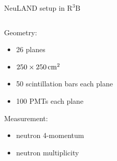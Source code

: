 \documentclass[compress, 13pt, aspectratio=169]{beamer}
\begin{document}
{\begin{frame}{NeuLAND setup in $\text{R}^3\text{B}$}
\begin{columns}[c]
\begin{column}{0.3\textwidth}
                \begin{exampleblock}{}
                    Geometry:\\
                    \begin{itemize}
                        \item 26 planes
                        \item $\qtyproduct[product-units=power]{250 x 250}{\centi\meter}$ 
                        \item 50 scintillation bars each plane
                        \item 100 PMTs each plane
                    \end{itemize}
                    \pause
                    Measurement:\\
                    \begin{itemize}
                        \item neutron 4-momentum
                        \item neutron multiplicity 
                    \end{itemize}
                \end{exampleblock}
            \end{column}
            \begin{column}{0.3\textwidth}
            \end{column}
        \end{columns}
        \let\thefootnote\relax{}
    \end{frame}
}
\end{document}
